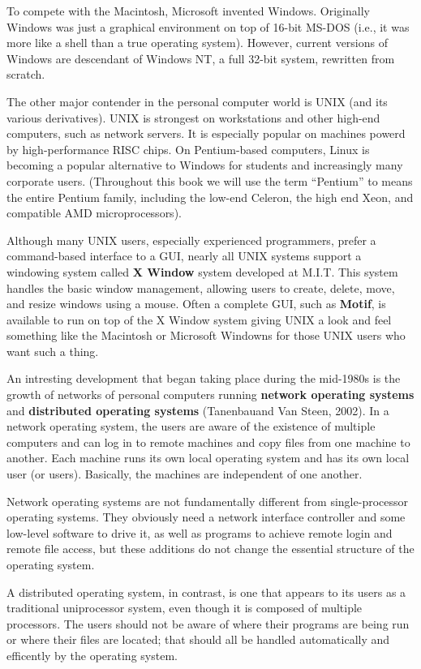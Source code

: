 \documentclass{book}
\newcommand {\kw}  [1] {\textbf{#1}}
\begin{document}
To compete with the Macintosh, Microsoft invented Windows.
Originally Windows was just a graphical environment on top of 16-bit MS-DOS (i.e., it was more like a shell than a true operating system).
However, current versions of Windows are descendant of Windows NT, a full 32-bit system, rewritten from scratch.

The other major contender in the personal computer world is UNIX (and its various derivatives).
UNIX is strongest on workstations and other high-end computers, such as network servers.
It is especially popular on machines powerd by high-performance RISC chips.
On Pentium-based computers, Linux is becoming a popular alternative to Windows for students and increasingly many corporate users.
(Throughout this book we will use the term ``Pentium'' to means the entire Pentium family, 
including the low-end Celeron, the high end Xeon, and compatible AMD microprocessors).

Although many UNIX users, especially experienced programmers, prefer a command-based interface to a GUI, 
nearly all UNIX systems support a windowing system called \kw{X Window} system developed at M.I.T.
This system handles the basic window management, allowing users to create, delete, move, and resize windows using a mouse.
Often a complete GUI, such as \kw{Motif}, is available to run on top of the X Window system 
giving UNIX a look and feel something like the Macintosh or Microsoft Windowns for those UNIX users who want such a thing.

An intresting development that began taking place during the mid-1980s is the growth of 
networks of personal computers running \kw{network operating systems} and \kw{distributed operating systems} (Tanenbauand Van Steen, 2002).
In a network operating system, the users are aware of the existence of multiple computers 
and can log in to remote machines and copy files from one machine to another.
Each machine runs its own local operating system and has its own local user (or users).
Basically, the machines are independent of one another.

Network operating systems are not fundamentally different from single-processor operating systems.
They obviously need a network interface controller and some low-level software to drive it, 
as well as programs to achieve remote login and remote file access, 
but these additions do not change the essential structure of the operating system.

A distributed operating system, in contrast, is one that appears to its users as a traditional uniprocessor system, 
even though it is composed of multiple processors.
The users should not be aware of where their programs are being run or where their files are located;
that should all be handled automatically and efficently by the operating system.
\end{document}
